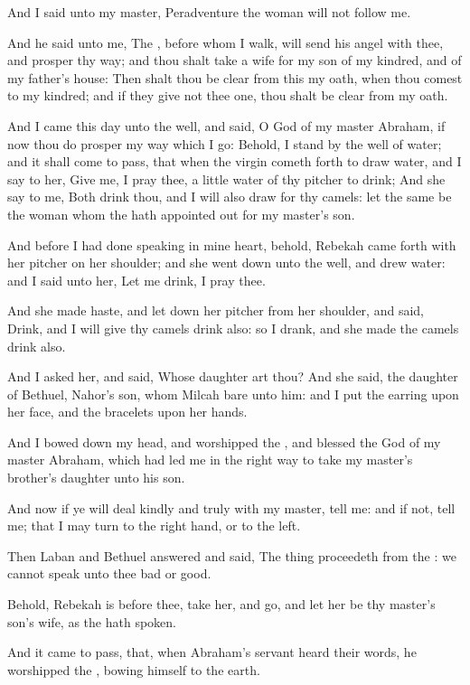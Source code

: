 \Verse And I said unto my master, Peradventure the woman will not follow me.

\Verse And he said unto me, The \LORD, before whom I walk, will send his angel with thee, and prosper thy way; and thou shalt take a wife for my son of my kindred, and of my father's house: \Verse Then shalt thou be clear from this my oath, when thou comest to my kindred; and if they give not thee one, thou shalt be clear from my oath.

\Verse And I came this day unto the well, and said, O \LORD God of my master Abraham, if now thou do prosper my way which I go: \Verse Behold, I stand by the well of water; and it shall come to pass, that when the virgin cometh forth to draw water, and I say to her, Give me, I pray thee, a little water of thy pitcher to drink; \Verse And she say to me, Both drink thou, and I will also draw for thy camels: let the same be the woman whom the \LORD hath appointed out for my master's son.

\Verse And before I had done speaking in mine heart, behold, Rebekah came forth with her pitcher on her shoulder; and she went down unto the well, and drew water: and I said unto her, Let me drink, I pray thee.

\Verse And she made haste, and let down her pitcher from her shoulder, and said, Drink, and I will give thy camels drink also: so I drank, and she made the camels drink also.

\Verse And I asked her, and said, Whose daughter art thou? And she said, the daughter of Bethuel, Nahor's son, whom Milcah bare unto him: and I put the earring upon her face, and the bracelets upon her hands.

\Verse And I bowed down my head, and worshipped the \LORD, and blessed the \LORD God of my master Abraham, which had led me in the right way to take my master's brother's daughter unto his son.

\Verse And now if ye will deal kindly and truly with my master, tell me: and if not, tell me; that I may turn to the right hand, or to the left.

\Verse Then Laban and Bethuel answered and said, The thing proceedeth from the \LORD: we cannot speak unto thee bad or good.

\Verse Behold, Rebekah is before thee, take her, and go, and let her be thy master's son's wife, as the \LORD hath spoken.

\Verse And it came to pass, that, when Abraham's servant heard their words, he worshipped the \LORD, bowing himself to the earth.

